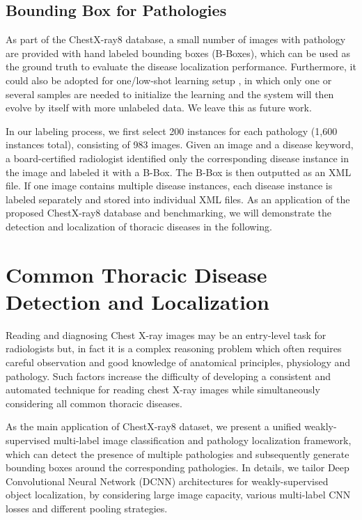 \documentclass[10pt,twocolumn,letterpaper]{article}
\begin{document}
\subsection{Bounding Box for Pathologies}
As part of the ChestX-ray8 database, a small number of images with pathology are provided with hand labeled bounding boxes (B-Boxes), which can be used as the ground truth to evaluate the disease localization performance. Furthermore, it could also be adopted for one/low-shot learning setup \cite{hariharan2016low}, in which only one or several samples are needed to initialize the learning and the system will then evolve by itself with more unlabeled data. We leave this as future work.

In our labeling process, we first select 200 instances for each pathology (1,600 instances total), consisting of 983 images. Given an image and a disease keyword, a board-certified radiologist identified only the corresponding disease instance in the image and labeled it with a B-Box. The B-Box is then outputted as an XML file. If one image contains multiple disease instances, each disease instance is labeled separately and stored into individual XML files. As an application of the proposed ChestX-ray8 database and benchmarking, we will demonstrate the detection and localization of thoracic diseases in the following. 



\section{Common Thoracic Disease Detection and Localization}

Reading and diagnosing Chest X-ray images may be an entry-level task for radiologists but, in fact it is a complex reasoning problem which often requires careful observation and good knowledge of anatomical principles, physiology and pathology. Such factors increase the difficulty of developing a consistent and automated technique for reading chest X-ray images while simultaneously considering all common thoracic diseases. 

As the main application of ChestX-ray8 dataset, we present a unified weakly-supervised multi-label image classification and pathology localization framework, which can detect the presence of multiple pathologies and subsequently generate bounding boxes around the corresponding pathologies. In details, we tailor Deep Convolutional Neural Network (DCNN) architectures for weakly-supervised object localization, by considering large image capacity, various multi-label CNN losses and different pooling strategies.
\end{document}
